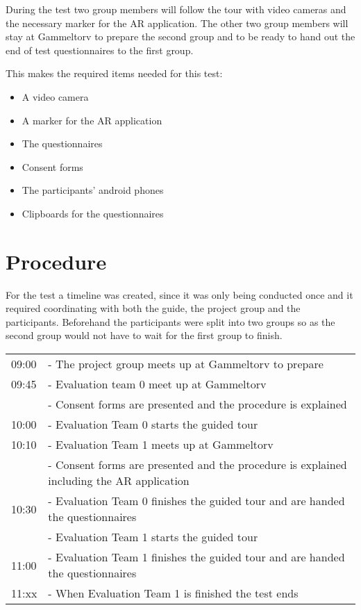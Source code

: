 During the test two group members will follow the tour with video cameras and the necessary marker for the AR application. The other two group members will stay at Gammeltorv to prepare the second group and to be ready to hand out the end of test questionnaires to the first group. 

This makes the required items needed for this test:
\begin{itemize}
\item A video camera
\item A marker for the AR application
\item The questionnaires
\item Consent forms
\item The participants' android phones
\item Clipboards for the questionnaires
\end{itemize}



\section{Procedure}
For the test a timeline was created, since it was only being conducted once and it required coordinating with both the guide, the project group and the participants. Beforehand the participants were split into two groups so as the second group would not have to wait for the first group to finish. 

\begin{tabular}{l p{12cm}}
09:00 & - The project group meets up at Gammeltorv to prepare \\
09:45 & - Evaluation team 0 meet up at Gammeltorv \\
 & - Consent forms are presented and the procedure is explained \\
10:00 &   - Evaluation Team 0 starts the guided tour \\
10:10 & - Evaluation Team 1 meets up at Gammeltorv \\
 & - Consent forms are presented and the procedure is explained including the AR application \\
10:30 & - Evaluation Team 0 finishes the guided tour and are handed the questionnaires \\
 & - Evaluation Team 1 starts the guided tour
\\ 
11:00 & - Evaluation Team 1 finishes the guided tour and are handed the questionnaires \\
11:xx & - When Evaluation Team 1 is finished the test ends \\
\end{tabular}


